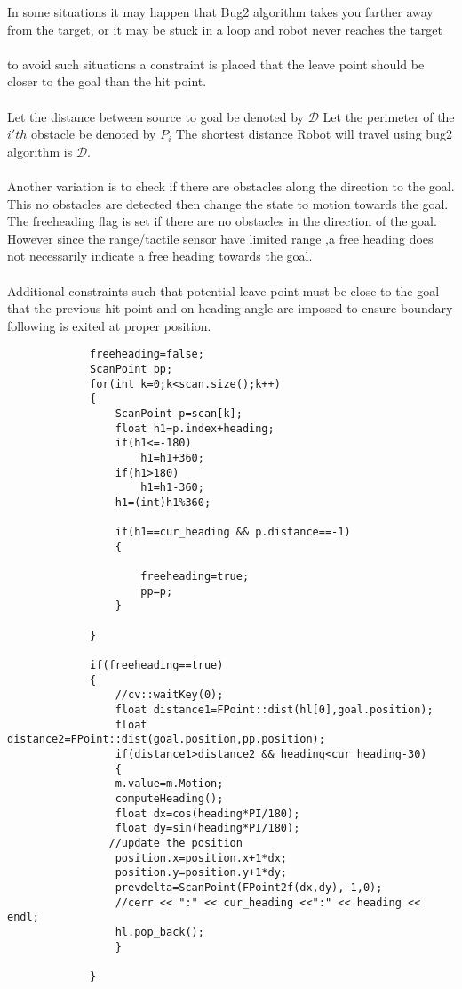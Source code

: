 \documentclass[fontsize=12pt, %
                             paper=a4, %
                             oneside, %
                             captions=tableheading,
                             index=totoc,
                             hyperref]{labbook}
\begin{document}
In some situations it may happen that Bug2 algorithm takes you farther away from the target,
or it may be stuck in a loop and robot never reaches the target
\\\\
to avoid such situations a constraint is placed that the leave point should be closer
to the goal than the hit point.
\\\\
Let the distance between source to goal be denoted by $\mathcal{D}$
Let the perimeter of the $i'th$ obstacle be denoted by $P_i$
The shortest distance Robot will travel using bug2 algorithm is $\mathcal{D}$.
\\\\
Another variation is to check if there are obstacles along the direction to the goal.
This no obstacles are detected then change the state to motion towards the goal.
The freeheading flag is set if there are no obstacles in the direction of the goal.
However since the range/tactile sensor have limited range ,a free heading does not
necessarily indicate a free heading towards the goal.
\\\\
Additional constraints such that potential leave point must be close to the goal
that the previous hit point and on heading angle are imposed to ensure 
boundary following is exited at proper position.
\begin{verbatim}
             freeheading=false;
             ScanPoint pp;
             for(int k=0;k<scan.size();k++)
             {
                 ScanPoint p=scan[k];
                 float h1=p.index+heading;
                 if(h1<=-180)
                     h1=h1+360;
                 if(h1>180)
                     h1=h1-360;
                 h1=(int)h1%360;

                 if(h1==cur_heading && p.distance==-1)
                 {

                     freeheading=true;
                     pp=p;
                 }

             }

             if(freeheading==true)
             {
                 //cv::waitKey(0);
                 float distance1=FPoint::dist(hl[0],goal.position);
                 float distance2=FPoint::dist(goal.position,pp.position);
                 if(distance1>distance2 && heading<cur_heading-30)
                 {
                 m.value=m.Motion;
                 computeHeading();
                 float dx=cos(heading*PI/180);
                 float dy=sin(heading*PI/180);
                //update the position
                 position.x=position.x+1*dx;
                 position.y=position.y+1*dy;
                 prevdelta=ScanPoint(FPoint2f(dx,dy),-1,0);
                 //cerr << ":" << cur_heading <<":" << heading << endl;
                 hl.pop_back();
                 }

             }

\end{verbatim}
\end{document}
